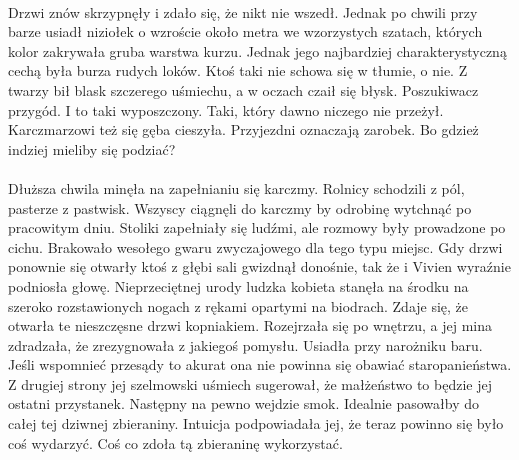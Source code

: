 \documentclass[10pt,twoside,twocolumn]{book}
\begin{document}
\paragraph{}
Drzwi znów skrzypnęły i zdało się, że nikt nie wszedł. 
Jednak po chwili przy barze usiadł niziołek o wzroście około metra we wzorzystych szatach, których kolor zakrywała gruba warstwa kurzu. 
Jednak jego najbardziej charakterystyczną cechą była burza rudych loków. 
Ktoś taki nie schowa się w tłumie, o nie. 
Z twarzy bił blask szczerego uśmiechu, a w oczach czaił się błysk. 
Poszukiwacz przygód. 
I to taki wyposzczony. 
Taki, który dawno niczego nie przeżył. 
Karczmarzowi też się gęba cieszyła. 
Przyjezdni oznaczają zarobek. 
Bo gdzież indziej mieliby się podziać?

\paragraph{}
Dłuższa chwila minęła na zapełnianiu się karczmy. 
Rolnicy schodzili z pól, pasterze z pastwisk. 
Wszyscy ciągnęli do karczmy by odrobinę wytchnąć po pracowitym dniu. 
Stoliki zapełniały się ludźmi, ale rozmowy były prowadzone po cichu. 
Brakowało wesołego gwaru zwyczajowego dla tego typu miejsc. 
Gdy drzwi ponownie się otwarły ktoś z głębi sali gwizdnął donośnie, tak że i Vivien wyraźnie podniosła głowę. 
Nieprzeciętnej urody ludzka kobieta stanęła na środku na szeroko rozstawionych nogach z rękami opartymi na biodrach. 
Zdaje się, że otwarła te nieszczęsne drzwi kopniakiem. 
Rozejrzała się po wnętrzu, a jej mina zdradzała, że zrezygnowała z jakiegoś pomysłu. 
Usiadła przy narożniku baru. 
Jeśli wspomnieć przesądy to akurat ona nie powinna się obawiać staropanieństwa. 
Z drugiej strony jej szelmowski uśmiech sugerował, że małżeństwo to będzie jej ostatni przystanek.
Następny na pewno wejdzie smok. 
Idealnie pasowałby do całej tej dziwnej zbieraniny. 
Intuicja podpowiadała jej, że teraz powinno się było coś wydarzyć. 
Coś co zdoła tą zbieraninę wykorzystać.
\end{document}

